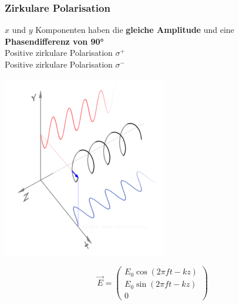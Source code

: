 


\subsubsection{Zirkulare Polarisation}

$x$ und $y$ Komponenten haben die \textbf{gleiche Amplitude} und eine \textbf{Phasendifferenz von 90°} \\

Positive zirkulare Polarisation $\sigma ^+$ \\
Positive zirkulare Polarisation $\sigma ^-$ \\


\begin{minipage}{0.48\linewidth}
\includegraphics[width=0.8\linewidth]{Bilder/Wellen-Optik/Zirkulare_Polarisation}
\end{minipage}
\hfill
\begin{minipage}{0.48\linewidth}
$$ \boxed{ \vec{E} = \begin{pmatrix} E_0 \cos(2 \pi ft-kz) \\ E_0 \sin(2 \pi ft -kz) \\ 0 \end{pmatrix}  } $$

\end{minipage}



